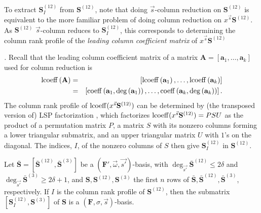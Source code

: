 To extract $\mathbf{S}_{I}^{\left(12\right)}$ from $\mathbf{S}^{\left(12\right)}$,
note that doing $\vec{s}$-column reduction on $\mathbf{S}^{\left(12\right)}$
is equivalent to the more familiar problem of doing column reduction
on $x^{\vec{s}}\mathbf{S}^{\left(12\right)}$. As $\mathbf{S}^{\left(12\right)}$
$\vec{s}$-column reduces to \textbf{$\mathbf{S}_{I}^{\left(12\right)}$},
this corresponds to determining the column rank profile of the\emph{
leading column coefficient matrix }of\emph{ }\textbf{$x^{\vec{s}}\mathbf{S}^{\left(12\right)}$}%
\begin{comment}
\emph{ }$S^{\left(12\right)}=\lcoeff(x^{\vec{s}}\cdot\mathbf{S}^{\left(12\right)})$ 
\end{comment}
{}\emph{. }Recall that the leading column coefficient matrix of a matrix
$\mathbf{A}=\left[\mathbf{a}_{1},\dots,\mathbf{a}_{k}\right]$ used
for column reduction is\emph{ \begin{eqnarray*}
\operatorname{lcoeff}\left(\mathbf{A}\right) & = & \left[\operatorname{lcoeff}\left(\mathbf{a}_{1}\right),\dots,\operatorname{lcoeff}\left(\mathbf{a}_{k}\right)\right]\\
 & = & \left[\operatorname{coeff}\left(\mathbf{a}_{1},\deg\left(\mathbf{a}_{1}\right)\right),\dots,\operatorname{coeff}\left(\mathbf{a}_{k},\deg\left(\mathbf{a}_{k}\right)\right)\right].\end{eqnarray*}
 }The column rank profile of $\operatorname{lcoeff}(x^{\vec{s}}\mathbf{S}^{\left(12\right)})$
can be determined by (the transposed version of) LSP factorization
\citep{IbarraMH82}, which factorizes $\operatorname{lcoeff}(x^{\vec{s}}\mathbf{S}^{\left(12\right)})=PSU$
as the product of a permutation matrix $P$, a matrix $S$ with its
nonzero columns forming a lower triangular submatrix, and an upper
triangular matrix $U$ with $1$'s on the diagonal. The indices, $I$,
of the nonzero columns of $S$ then give $\mathbf{S}_{I}^{\left(12\right)}$
in $\mathbf{S}^{\left(12\right)}$. 
\begin{thm}
\label{thm:mainTheorem}Let $\bar{\mathbf{S}}=[\bar{\mathbf{S}}^{\left(12\right)},\bar{\mathbf{S}}^{\left(3\right)}]$
be a $(\mathbf{F}',\vec{\omega},\vec{s'})$-basis, with $\deg_{\vec{s'}}\bar{\mathbf{S}}^{\left(12\right)}\le2\delta$
and $\deg_{\vec{s'}}\bar{\mathbf{S}}^{\left(3\right)}\ge2\delta+1$,
and $\mathbf{S},\mathbf{S}^{\left(12\right)},\mathbf{S}^{\left(3\right)}$
the first $n$ rows of $\bar{\mathbf{S}},\bar{\mathbf{S}}^{\left(12\right)},\bar{\mathbf{S}}^{\left(3\right)}$,
respectively. If $I$ is the column rank profile of $\mathbf{S}^{\left(12\right)}$,
then the submatrix \textbf{ $[\mathbf{S}_{I}^{\left(12\right)},\mathbf{S}^{\left(3\right)}]$
}of $\mathbf{S}$ is a $\left(\mathbf{F},\sigma,\vec{s}\right)$-basis. \end{thm}
